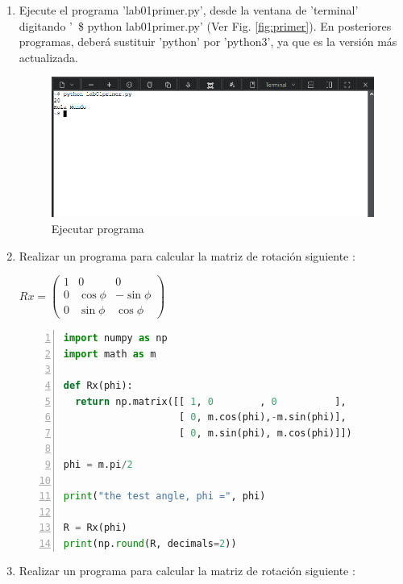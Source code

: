 \documentclass[12pt,oneside,spanish]{article}
\begin{document}
\begin{enumerate}
\item Ejecute el programa 'lab01primer.py', desde la ventana de 'terminal' digitando '~\$ python lab01primer.py' (Ver Fig. \ref{fig:primer}). En posteriores programas, deberá sustituir 'python' por 'python3', ya que es la versión más actualizada.

\begin{figure}[h]
    \centering
    \includegraphics[scale=0.7]{Codigo/4.Ejecutar.png}
    \caption{Ejecutar programa}
\end{figure}

\item Realizar un programa para calcular la matriz de rotación siguiente \cite{fossen:2011}:

$R{x} = \begin{pmatrix} 1 & 0 & 0 \\ 0 & \cos\phi & -\sin\phi \\ 0 & \sin\phi & \cos\phi \end{pmatrix}$
\\
\begin{lstlisting}[language=Python,numbers=left,numbersep=5pt,numberstyle=\tiny, frame=single]
import numpy as np
import math as m
  
def Rx(phi):
  return np.matrix([[ 1, 0        , 0          ],
                    [ 0, m.cos(phi),-m.sin(phi)],
                    [ 0, m.sin(phi), m.cos(phi)]])

phi = m.pi/2

print("the test angle, phi =", phi)
  
R = Rx(phi)
print(np.round(R, decimals=2))
\end{lstlisting}



\item Realizar un programa para calcular la matriz de rotación siguiente \cite{fossen:2011}:


\end{enumerate}
\end{document}
